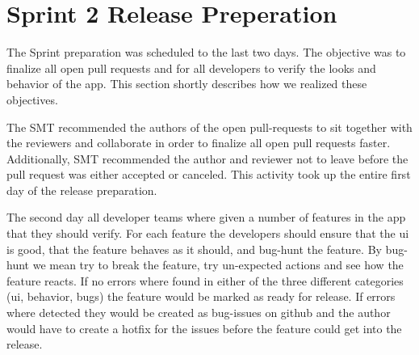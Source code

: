 \section{Sprint 2 Release Preperation}
The Sprint preparation was scheduled to the last two days. The objective was to finalize all open pull requests and for all developers to verify the looks and behavior of the app. This section shortly describes how we realized these objectives.

The \gls{SMT} recommended the authors of the open pull-requests to sit together with the reviewers and collaborate in order to finalize all open pull requests faster. Additionally, \gls{SMT} recommended the author and reviewer not to leave before the pull request was either accepted or canceled. This activity took up the entire first day of the release preparation.

The second day all developer teams where given a number of features in the app that they should verify. For each feature the developers should ensure that the \gls{ui} is good, that the feature behaves as it should, and bug-hunt the feature. By bug-hunt we mean try to break the feature, try un-expected actions and see how the feature reacts. If no errors where found in either of the three different categories (\gls{ui}, behavior, bugs) the feature would be marked as ready for release. If errors where detected they would be created as bug-issues on github and the author would have to create a hotfix for the issues before the feature could get into the release.